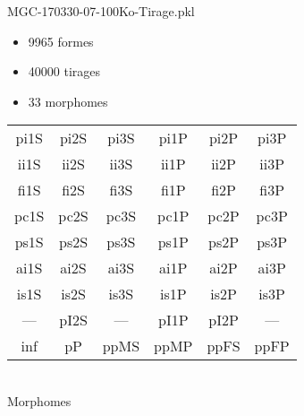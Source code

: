 MGC-170330-07-100Ko-Tirage.pkl
\begin{itemize}
\item 9965 formes
\item 40000 tirages
\item 33 morphomes
\end{itemize}
\begin{center}
\begin{tabular}{cccccc}
\hline
\cellcolor{white}pi1S & \cellcolor{orange}pi2S & \cellcolor{orange}pi3S & \cellcolor{white}pi1P & \cellcolor{white}pi2P & \cellcolor{white}pi3P\\
\cellcolor{brown}ii1S & \cellcolor{brown}ii2S & \cellcolor{brown}ii3S & \cellcolor{white}ii1P & \cellcolor{white}ii2P & \cellcolor{brown}ii3P\\
\cellcolor{yellow}fi1S & \cellcolor{lime}fi2S & \cellcolor{lime}fi3S & \cellcolor{green}fi1P & \cellcolor{white}fi2P & \cellcolor{green}fi3P\\
\cellcolor{yellow}pc1S & \cellcolor{yellow}pc2S & \cellcolor{yellow}pc3S & \cellcolor{white}pc1P & \cellcolor{white}pc2P & \cellcolor{yellow}pc3P\\
\cellcolor{teal}ps1S & \cellcolor{white}ps2S & \cellcolor{teal}ps3S & \cellcolor{white}ps1P & \cellcolor{white}ps2P & \cellcolor{teal}ps3P\\
\cellcolor{white}ai1S & \cellcolor{lightgray}ai2S & \cellcolor{lightgray}ai3S & \cellcolor{white}ai1P & \cellcolor{blue}ai2P & \cellcolor{white}ai3P\\
\cellcolor{black}is1S & \cellcolor{white}is2S & \cellcolor{lightgray}is3S & \cellcolor{black}is1P & \cellcolor{black}is2P & \cellcolor{white}is3P\\
--- & \cellcolor{white}pI2S & --- & \cellcolor{white}pI1P & \cellcolor{blue}pI2P & ---\\
\cellcolor{white}inf & \cellcolor{white}pP & \cellcolor{white}ppMS & \cellcolor{white}ppMP & \cellcolor{white}ppFS & \cellcolor{white}ppFP\\
\hline
\end{tabular}\\
Morphomes
\end{center}
\bigskip

